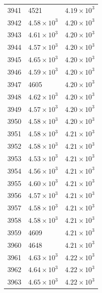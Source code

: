 \begin{table}[H]
\begin{tabular}{lll}
3941 & 4521 & $\displaystyle 4.19 \times 10^{3}$ \\
3942 & $\displaystyle 4.58 \times 10^{3}$ & $\displaystyle 4.20 \times 10^{3}$ \\
3943 & $\displaystyle 4.61 \times 10^{3}$ & $\displaystyle 4.20 \times 10^{3}$ \\
3944 & $\displaystyle 4.57 \times 10^{3}$ & $\displaystyle 4.20 \times 10^{3}$ \\
3945 & $\displaystyle 4.65 \times 10^{3}$ & $\displaystyle 4.20 \times 10^{3}$ \\
3946 & $\displaystyle 4.59 \times 10^{3}$ & $\displaystyle 4.20 \times 10^{3}$ \\
3947 & 4605 & $\displaystyle 4.20 \times 10^{3}$ \\
3948 & $\displaystyle 4.62 \times 10^{3}$ & $\displaystyle 4.20 \times 10^{3}$ \\
3949 & $\displaystyle 4.57 \times 10^{3}$ & $\displaystyle 4.20 \times 10^{3}$ \\
3950 & $\displaystyle 4.58 \times 10^{3}$ & $\displaystyle 4.20 \times 10^{3}$ \\
3951 & $\displaystyle 4.58 \times 10^{3}$ & $\displaystyle 4.21 \times 10^{3}$ \\
3952 & $\displaystyle 4.58 \times 10^{3}$ & $\displaystyle 4.21 \times 10^{3}$ \\
3953 & $\displaystyle 4.53 \times 10^{3}$ & $\displaystyle 4.21 \times 10^{3}$ \\
3954 & $\displaystyle 4.56 \times 10^{3}$ & $\displaystyle 4.21 \times 10^{3}$ \\
3955 & $\displaystyle 4.60 \times 10^{3}$ & $\displaystyle 4.21 \times 10^{3}$ \\
3956 & $\displaystyle 4.57 \times 10^{3}$ & $\displaystyle 4.21 \times 10^{3}$ \\
3957 & $\displaystyle 4.58 \times 10^{3}$ & $\displaystyle 4.21 \times 10^{3}$ \\
3958 & $\displaystyle 4.58 \times 10^{3}$ & $\displaystyle 4.21 \times 10^{3}$ \\
3959 & 4609 & $\displaystyle 4.21 \times 10^{3}$ \\
3960 & 4648 & $\displaystyle 4.21 \times 10^{3}$ \\
3961 & $\displaystyle 4.63 \times 10^{3}$ & $\displaystyle 4.22 \times 10^{3}$ \\
3962 & $\displaystyle 4.64 \times 10^{3}$ & $\displaystyle 4.22 \times 10^{3}$ \\
3963 & $\displaystyle 4.65 \times 10^{3}$ & $\displaystyle 4.22 \times 10^{3}$ \\

\end{tabular}
\end{table}
